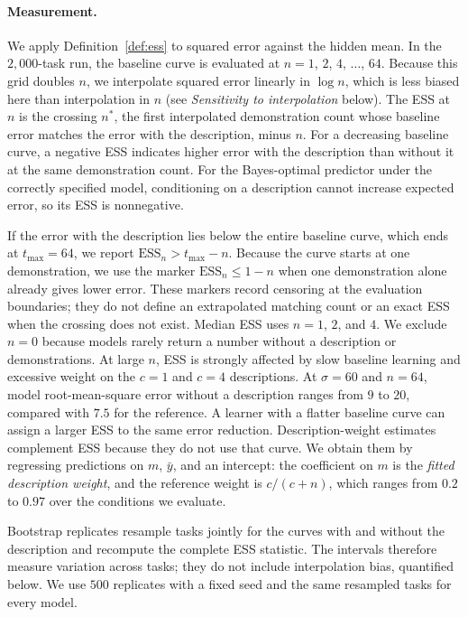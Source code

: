 \documentclass{article}
\theoremstyle{definition}
\newcommand{\ess}{\mathrm{ESS}}
\begin{document}
\paragraph{Measurement.}
We apply Definition~\ref{def:ess} to squared error against the hidden mean. In the $2{,}000$-task run, the baseline curve is evaluated at $n = 1$, $2$, $4$, $\ldots$, $64$. Because this grid doubles $n$, we interpolate squared error linearly in $\log n$, which is less biased here than interpolation in $n$ (see \emph{Sensitivity to interpolation} below). The ESS at $n$ is the crossing $n^*$, the first interpolated demonstration count whose baseline error matches the error with the description, minus $n$. For a decreasing baseline curve, a negative ESS indicates higher error with the description than without it at the same demonstration count. For the Bayes-optimal predictor under the correctly specified model, conditioning on a description cannot increase expected error, so its ESS is nonnegative.

If the error with the description lies below the entire baseline curve, which ends at $t_{\max}=64$, we report $\ess_n > t_{\max}-n$. Because the curve starts at one demonstration, we use the marker $\ess_n \leq 1-n$ when one demonstration alone already gives lower error. These markers record censoring at the evaluation boundaries; they do not define an extrapolated matching count or an exact ESS when the crossing does not exist. Median ESS uses $n = 1$, $2$, and $4$. We exclude $n = 0$ because models rarely return a number without a description or demonstrations. At large $n$, ESS is strongly affected by slow baseline learning and excessive weight on the $c = 1$ and $c = 4$ descriptions. At $\sigma = 60$ and $n = 64$, model root-mean-square error without a description ranges from $9$ to $20$, compared with $7.5$ for the reference. A learner with a flatter baseline curve can assign a larger ESS to the same error reduction. Description-weight estimates complement ESS because they do not use that curve. We obtain them by regressing predictions on $m$, $\bar y$, and an intercept: the coefficient on $m$ is the \emph{fitted description weight}, and the reference weight is $c/(c+n)$, which ranges from $0.2$ to $0.97$ over the conditions we evaluate.

Bootstrap replicates resample tasks jointly for the curves with and without the description and recompute the complete ESS statistic. The intervals therefore measure variation across tasks; they do not include interpolation bias, quantified below. We use $500$ replicates with a fixed seed and the same resampled tasks for every model.
\end{document}
